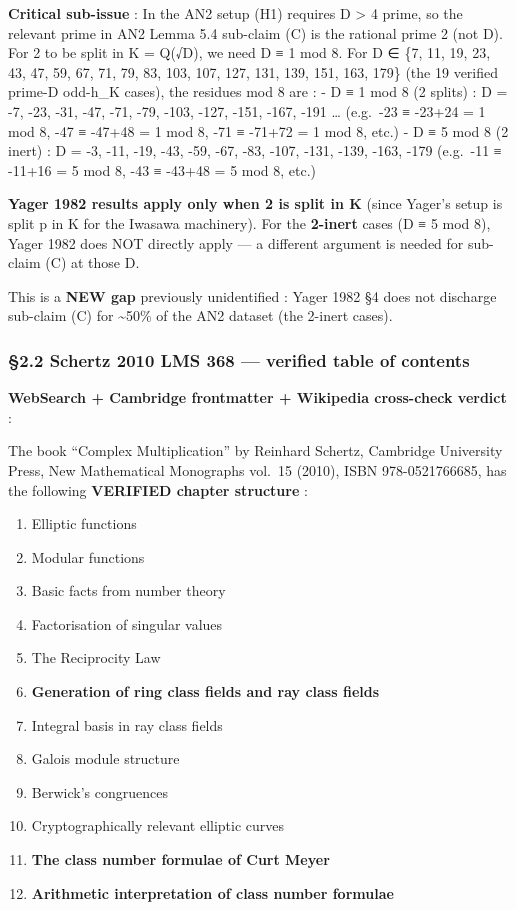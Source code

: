 \documentclass[
  11pt,
  a4paper,
]{article}
\providecommand{\tightlist}{\setlength{\itemsep}{0pt}\setlength{\parskip}{0pt}}
\providecommand{\tightlist}{%
  \setlength{\itemsep}{0pt}\setlength{\parskip}{0pt}}
\begin{document}
\textbf{Critical sub-issue} : In the AN2 setup (H1) requires \textbar D\textbar{} \textgreater{} 4 prime, so the relevant prime in AN2 Lemma 5.4 sub-claim (C) is the rational prime 2 (not \textbar D\textbar). For 2 to be split in K = Q(√D), we need D ≡ 1 mod 8. For \textbar D\textbar{} ∈ \{7, 11, 19, 23, 43, 47, 59, 67, 71, 79, 83, 103, 107, 127, 131, 139, 151, 163, 179\} (the 19 verified prime-\textbar D\textbar{} odd-h\_K cases), the residues mod 8 are :
- D ≡ 1 mod 8 (2 splits) : D = -7, -23, -31, -47, -71, -79, -103, -127, -151, -167, -191 \ldots{} (e.g.~-23 ≡ -23+24 = 1 mod 8, -47 ≡ -47+48 = 1 mod 8, -71 ≡ -71+72 = 1 mod 8, etc.)
- D ≡ 5 mod 8 (2 inert) : D = -3, -11, -19, -43, -59, -67, -83, -107, -131, -139, -163, -179 (e.g.~-11 ≡ -11+16 = 5 mod 8, -43 ≡ -43+48 = 5 mod 8, etc.)

\textbf{Yager 1982 results apply only when 2 is split in K} (since Yager's setup is split p in K for the Iwasawa machinery). For the \textbf{2-inert} cases (D ≡ 5 mod 8), Yager 1982 does NOT directly apply --- a different argument is needed for sub-claim (C) at those D.

This is a \textbf{NEW gap} previously unidentified : Yager 1982 §4 does not discharge sub-claim (C) for \textasciitilde50\% of the AN2 dataset (the 2-inert cases).

\hypertarget{schertz-2010-lms-368-verified-table-of-contents}{%
\subsubsection{§2.2 Schertz 2010 LMS 368 --- verified table of contents}\label{schertz-2010-lms-368-verified-table-of-contents}}

\textbf{WebSearch + Cambridge frontmatter + Wikipedia cross-check verdict} :

The book ``Complex Multiplication'' by Reinhard Schertz, Cambridge University Press, New Mathematical Monographs vol.~15 (2010), ISBN 978-0521766685, has the following \textbf{VERIFIED chapter structure} :

\begin{enumerate}
\def\labelenumi{\arabic{enumi}.}
\tightlist
\item
  Elliptic functions
\item
  Modular functions
\item
  Basic facts from number theory
\item
  Factorisation of singular values
\item
  The Reciprocity Law
\item
  \textbf{Generation of ring class fields and ray class fields}
\item
  Integral basis in ray class fields
\item
  Galois module structure
\item
  Berwick's congruences
\item
  Cryptographically relevant elliptic curves
\item
  \textbf{The class number formulae of Curt Meyer}
\item
  \textbf{Arithmetic interpretation of class number formulae}
\end{enumerate}
\end{document}
